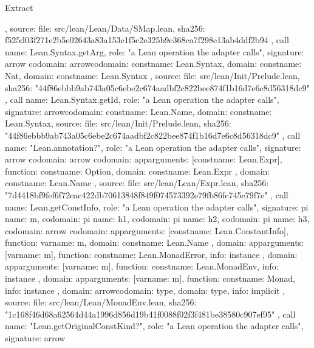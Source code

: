\begin{lexlean}{Extract}
\begin{toolingmodule}
{{{      },
      source: {
        file: src/lean/Lean/Data/SMap.lean,
        sha256: f525d03f271e2b5e02643a83a153e1f5c2e325b9c368ca7f298e13ab4ddf2b94
      }
    },
    call{
      name: Lean.Syntax.getArg,
      role: "a Lean operation the adapter calls",
      signature: arrow{
        codomain: arrow{codomain: const{name: Lean.Syntax}, domain: const{name: Nat}},
        domain: const{name: Lean.Syntax}
      },
      source: {
        file: src/lean/Init/Prelude.lean,
        sha256: "44f86ebbb9ab743a05c6ebe2c674aadbf2c822bee874f1b16d7e6c8d56318dc9"
      }
    },
    call{
      name: Lean.Syntax.getId,
      role: "a Lean operation the adapter calls",
      signature: arrow{codomain: const{name: Lean.Name}, domain: const{name: Lean.Syntax}},
      source: {
        file: src/lean/Init/Prelude.lean,
        sha256: "44f86ebbb9ab743a05c6ebe2c674aadbf2c822bee874f1b16d7e6c8d56318dc9"
      }
    },
    call{
      name: "Lean.annotation?",
      role: "a Lean operation the adapter calls",
      signature: arrow{
        codomain: arrow{
          codomain: app{arguments: [const{name: Lean.Expr}], function: const{name: Option}},
          domain: const{name: Lean.Expr}
        },
        domain: const{name: Lean.Name}
      },
      source: {
        file: src/lean/Lean/Expr.lean,
        sha256: "7d4418bf9fef6f72eac422db70613848f849f074573392e79fb86fe745e79f7e"
      }
    },
    call{
      name: Lean.getConstInfo,
      role: "a Lean operation the adapter calls",
      signature: pi{
        name: m,
        codomain: pi{
          name: h1,
          codomain: pi{
            name: h2,
            codomain: pi{
              name: h3,
              codomain: arrow{
                codomain: app{arguments: [const{name: Lean.ConstantInfo}], function: var{name: m}},
                domain: const{name: Lean.Name}
              },
              domain: app{arguments: [var{name: m}], function: const{name: Lean.MonadError}},
              info: instance
            },
            domain: app{arguments: [var{name: m}], function: const{name: Lean.MonadEnv}},
            info: instance
          },
          domain: app{arguments: [var{name: m}], function: const{name: Monad}},
          info: instance
        },
        domain: arrow{codomain: type{}, domain: type{}},
        info: implicit
      },
      source: {
        file: src/lean/Lean/MonadEnv.lean,
        sha256: "1c168f46d68a62564d44a1996d856d19b41f0088f02f3f481be38580c907ef95"
      }
    },
    call{
      name: "Lean.getOriginalConstKind?",
      role: "a Lean operation the adapter calls",
      signature: arrow{
}}}
\end{toolingmodule}
\end{lexlean}
